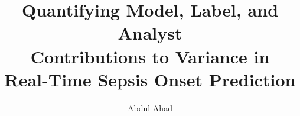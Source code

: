 
\usepackage[utf8]{inputenc}
\usepackage[T1]{fontenc}
\usepackage[english]{babel}
\usepackage{amsmath,amssymb}
\usepackage{graphicx}
\usepackage{booktabs}
\usepackage{tabularx}
\usepackage{multirow}
\usepackage{tikz}
\usepackage[most]{tcolorbox}
\usepackage{csquotes}
\usepackage[style=ieee,backend=biber,defernumbers=true]{biblatex}




\title{Quantifying Model, Label, and Analyst\\
       Contributions to Variance in\\
       Real-Time Sepsis Onset Prediction}
\author{Abdul Ahad}
\date{}
